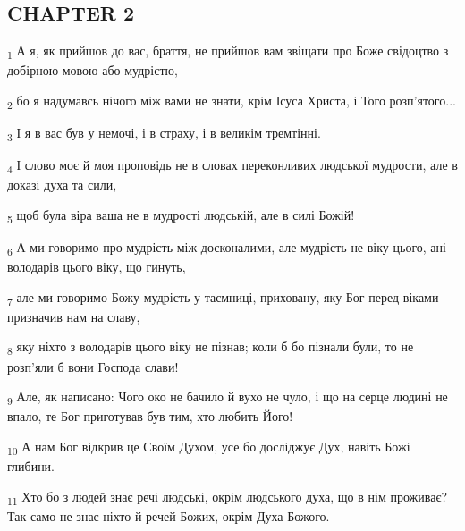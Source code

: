 \subsection{CHAPTER 2}
\begin{tcolorbox}
\textsubscript{1} А я, як прийшов до вас, браття, не прийшов вам звіщати про Боже свідоцтво з добірною мовою або мудрістю,
\end{tcolorbox}
\begin{tcolorbox}
\textsubscript{2} бо я надумавсь нічого між вами не знати, крім Ісуса Христа, і Того розп'ятого...
\end{tcolorbox}
\begin{tcolorbox}
\textsubscript{3} І я в вас був у немочі, і в страху, і в великім тремтінні.
\end{tcolorbox}
\begin{tcolorbox}
\textsubscript{4} І слово моє й моя проповідь не в словах переконливих людської мудрости, але в доказі духа та сили,
\end{tcolorbox}
\begin{tcolorbox}
\textsubscript{5} щоб була віра ваша не в мудрості людській, але в силі Божій!
\end{tcolorbox}
\begin{tcolorbox}
\textsubscript{6} А ми говоримо про мудрість між досконалими, але мудрість не віку цього, ані володарів цього віку, що гинуть,
\end{tcolorbox}
\begin{tcolorbox}
\textsubscript{7} але ми говоримо Божу мудрість у таємниці, приховану, яку Бог перед віками призначив нам на славу,
\end{tcolorbox}
\begin{tcolorbox}
\textsubscript{8} яку ніхто з володарів цього віку не пізнав; коли б бо пізнали були, то не розп'яли б вони Господа слави!
\end{tcolorbox}
\begin{tcolorbox}
\textsubscript{9} Але, як написано: Чого око не бачило й вухо не чуло, і що на серце людині не впало, те Бог приготував був тим, хто любить Його!
\end{tcolorbox}
\begin{tcolorbox}
\textsubscript{10} А нам Бог відкрив це Своїм Духом, усе бо досліджує Дух, навіть Божі глибини.
\end{tcolorbox}
\begin{tcolorbox}
\textsubscript{11} Хто бо з людей знає речі людські, окрім людського духа, що в нім проживає? Так само не знає ніхто й речей Божих, окрім Духа Божого.
\end{tcolorbox}
